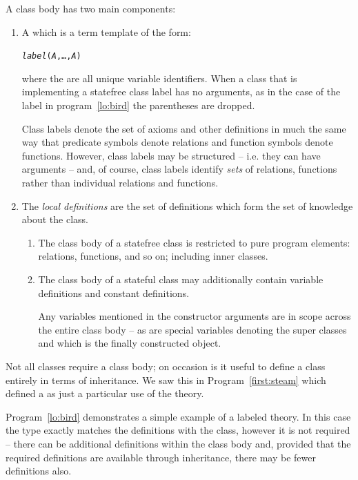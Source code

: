 A class body has two main components:
\begin{enumerate}
\item
A  which is a term template of the form:
\begin{alltt}
\emph{label}(\emph{A},\ldots,\emph{A\subn})
\end{alltt}
where the  are all unique variable identifiers. When a class that is implementing a statefree class label has no arguments, as in the case of the  label in program~\vref{lo:bird} the parentheses are dropped.

Class labels denote the set of axioms and other definitions in much the same way that predicate symbols denote relations and function symbols denote functions. However, class labels may be structured -- i.e. they can have arguments -- and, of course, class labels identify \emph{sets} of relations, functions rather than individual relations and functions.

\item
The \emph{local definitions} are the set of definitions which form the set of knowledge about the class. 

\begin{enumerate}
\item The class body of a statefree class is restricted to pure program elements: relations, functions, and so on; including inner classes.

\item The class body of a stateful class may additionally contain variable definitions and constant definitions.

Any variables mentioned in the constructor arguments are in scope across the entire class body -- as are special variables denoting the super classes and  which is the finally constructed object.
\end{enumerate}
\end{enumerate}

Not all classes require a class body; on occasion is it useful to define a class entirely in terms of inheritance. We saw this in Program~\vref{first:steam} which defined a  as just a particular use of the  theory.

Program~\vref{lo:bird} demonstrates a simple example of a labeled theory.
In this case the  type exactly matches the definitions with the  class, however it is not required -- there can be additional definitions within the class body and, provided that the required definitions are available through inheritance, there may be fewer definitions also.

